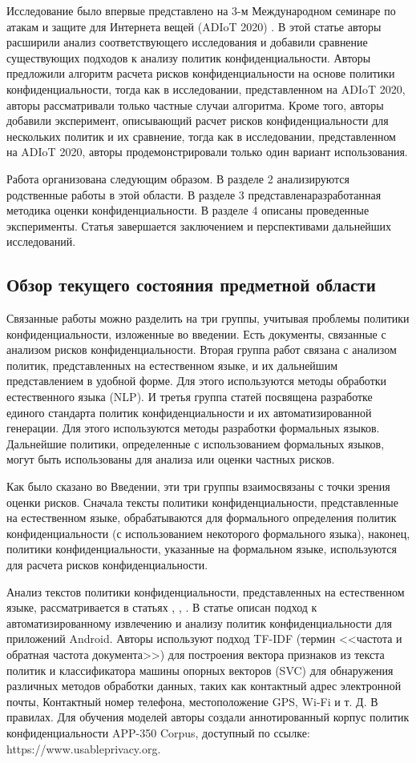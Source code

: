 \documentclass[../main]{subfiles}
\begin{document}
Исследование было впервые представлено на 3-м Международном семинаре по атакам и защите для Интернета вещей (ADIoT 2020) \cite{MDPI4}. В этой статье авторы расширили анализ соответствующего исследования и добавили сравнение существующих подходов к анализу политик конфиденциальности. Авторы предложили алгоритм расчета рисков конфиденциальности на основе политики конфиденциальности, тогда как в исследовании, представленном на ADIoT 2020, авторы рассматривали только частные случаи алгоритма. Кроме того, авторы добавили эксперимент, описывающий расчет рисков конфиденциальности для нескольких политик и их сравнение, тогда как в исследовании, представленном на ADIoT 2020, авторы продемонстрировали только один вариант использования.

Работа организована следующим образом. В разделе 2 анализируются родственные работы в этой области. В разделе 3 представлена ​​разработанная методика оценки конфиденциальности. В разделе 4 описаны проведенные эксперименты. Статья завершается заключением и перспективами дальнейших исследований. 

\subsection{Обзор текущего состояния предметной области}
Связанные работы можно разделить на три группы, учитывая проблемы политики конфиденциальности, изложенные во введении. Есть документы, связанные с анализом рисков конфиденциальности. Вторая группа работ связана с анализом политик, представленных на естественном языке, и их дальнейшим представлением в удобной форме. Для этого используются методы обработки естественного языка (NLP). И третья группа статей посвящена разработке единого стандарта политик конфиденциальности и их автоматизированной генерации. Для этого используются методы разработки формальных языков. Дальнейшие политики, определенные с использованием формальных языков, могут быть использованы для анализа или оценки частных рисков.

Как было сказано во Введении, эти три группы взаимосвязаны с точки зрения оценки рисков. Сначала тексты политики конфиденциальности, представленные на естественном языке, обрабатываются для формального определения политик конфиденциальности (с использованием некоторого формального языка), наконец, политики конфиденциальности, указанные на формальном языке, используются для расчета рисков конфиденциальности.

Анализ текстов политики конфиденциальности, представленных на естественном языке, рассматривается в статьях \cite{MDPI5}, \cite{MDPI6}, \cite{MDPI9}. В статье \cite{MDPI5} описан подход к автоматизированному извлечению и анализу политик конфиденциальности для приложений Android. Авторы используют подход TF-IDF (термин <<частота и обратная частота документа>>) для построения вектора признаков из текста политик и классификатора машины опорных векторов (SVC) для обнаружения различных методов обработки данных, таких как контактный адрес электронной почты, Контактный номер телефона, местоположение GPS, Wi-Fi и т. Д. В правилах. Для обучения моделей авторы создали аннотированный корпус политик конфиденциальности APP-350 Corpus, доступный по ссылке: https://www.usableprivacy.org.
\end{document}
